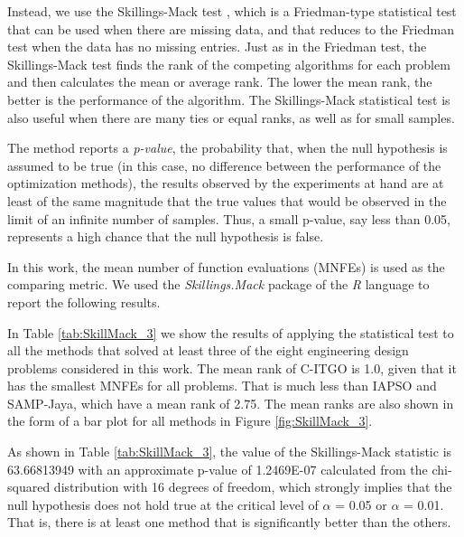 Instead, we use the Skillings-Mack test \citep{Skillings}, which is a Friedman\allowbreak-type statistical test that can be used when there are missing data, and that reduces to the Friedman test when the data has no missing entries. Just as in the Friedman test, the Skillings-Mack test finds the rank of the competing algorithms for each problem and then calculates the mean or average rank. The lower the mean rank, the better is the performance of the algorithm. The Skillings-Mack statistical test is also useful when there are many ties or equal ranks, as well as for small samples.

The method reports a \textit{p-value}, the probability that, when the null hypothesis is assumed to be true (in this case, no difference between the performance of the optimization methods), the results observed by the experiments at hand are at least of the same magnitude that the true values that would be observed in the limit of an infinite number of samples. Thus, a small p-value, say less than 0.05, represents a high chance that the null hypothesis is false.

In this work, the mean number of function evaluations (MNFEs) is used as the comparing metric. We used the \textit{Skillings.Mack} package \citep{SkillMack} of the \textit{R} language \citep{R} to report the following results.

In Table \ref{tab:SkillMack_3} we show the results of applying the statistical test to all the methods that solved at least three of the eight engineering design problems considered in this work. The mean rank of C-ITGO is 1.0, given that it has the smallest MNFEs for all problems. That is much less than IAPSO and SAMP-Jaya, which have a mean rank of 2.75. The mean ranks are also shown in the form of a bar plot for all methods in Figure \ref{fig:SkillMack_3}.





As shown in Table \ref{tab:SkillMack_3}, the value of the Skillings-Mack statistic is 63.66813949 with an approximate p-value of 1.2469E-07 calculated from the chi-squared distribution with 16 degrees of freedom, which strongly implies that the null hypothesis does not hold true at the critical level of $\alpha$ = 0.05 or $\alpha$ = 0.01. That is, there is at least one method that is significantly better than the others. 



